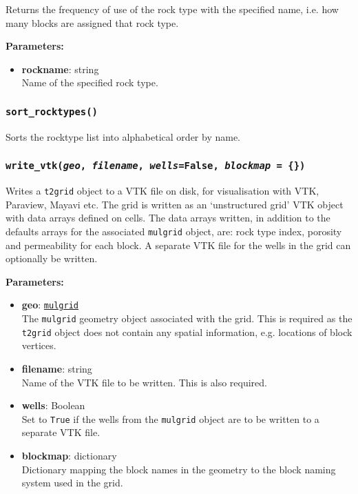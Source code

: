 Returns the frequency of use of the rock type with the specified name, i.e. how many blocks are assigned that rock type.

\textbf{Parameters:}
\begin{itemize}
\item \textbf{rockname}: string\\
  Name of the specified rock type.
\end{itemize}

\begin{snugshade}
\subsubsection{\texttt{sort\_rocktypes()}}
\end{snugshade}
\label{sec:t2grid:sort_rocktypes}

Sorts the rocktype list into alphabetical order by name.

\begin{snugshade}
\subsubsection{\texttt{write\_vtk(\emph{geo}, \emph{filename}, \emph{wells}=False, \emph{blockmap} = \{\})}}
\end{snugshade}
\label{sec:t2grid:write_vtk}

Writes a \texttt{t2grid} object to a VTK file on disk, for visualisation with VTK, Paraview, Mayavi etc.  The grid is written as an `unstructured grid' VTK object with data arrays defined on cells.  The data arrays written, in addition to the defaults arrays for the associated \texttt{mulgrid} object, are: rock type index, porosity and permeability for each block.  A separate VTK file for the wells in the grid can optionally be written.

\textbf{Parameters:}
\begin{itemize}
\item \textbf{geo}: \hyperref[mulgrids]{\texttt{mulgrid}}\\
  The \texttt{mulgrid} geometry object associated with the grid.  This is required as the \texttt{t2grid} object does not contain any spatial information, e.g. locations of block vertices.
\item \textbf{filename}: string\\
  Name of the VTK file to be written.  This is also required.
\item \textbf{wells}: Boolean\\
  Set to \texttt{True} if the wells from the \texttt{mulgrid} object are to be written to a separate VTK file.
\item \textbf{blockmap}: dictionary\\
  Dictionary mapping the block names in the geometry to the block naming system used in the grid.
\end{itemize}

